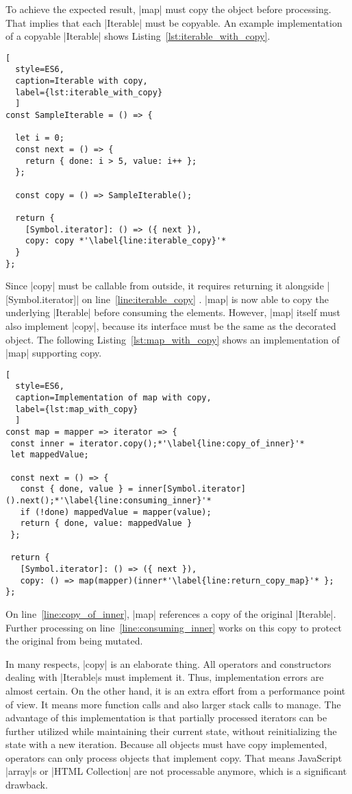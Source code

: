 To achieve the expected result, |map| must copy the object before processing.
That implies that each |Iterable| must be copyable. An example implementation
of a copyable |Iterable| shows Listing~\ref{lst:iterable_with_copy}.

\begin{lstlisting}[
  style=ES6, 
  caption=Iterable with copy,
  label={lst:iterable_with_copy}
  ]
const SampleIterable = () => {

  let i = 0;
  const next = () => {
    return { done: i > 5, value: i++ };
  };

  const copy = () => SampleIterable();

  return {
    [Symbol.iterator]: () => ({ next }),
    copy: copy *'\label{line:iterable_copy}'*
  }
};
\end{lstlisting}
Since |copy| must be callable from outside, it requires returning it alongside 
|[Symbol.iterator]| on line~\ref{line:iterable_copy} . |map| is now
able to copy the underlying  |Iterable| before consuming the elements.
However, |map| itself must also implement |copy|, because its interface must be
the same as the decorated object. The following Listing~\ref{lst:map_with_copy} 
shows an implementation of |map| supporting copy.

\begin{lstlisting}[
  style=ES6, 
  caption=Implementation of map with copy,
  label={lst:map_with_copy}
  ]
const map = mapper => iterator => {
 const inner = iterator.copy();*'\label{line:copy_of_inner}'*
 let mappedValue;

 const next = () => {
   const { done, value } = inner[Symbol.iterator]().next();*'\label{line:consuming_inner}'*
   if (!done) mappedValue = mapper(value);
   return { done, value: mappedValue }
 };

 return {
   [Symbol.iterator]: () => ({ next }),
   copy: () => map(mapper)(inner*'\label{line:return_copy_map}'* };
};
\end{lstlisting}
On line~\ref{line:copy_of_inner}, |map| references a copy of the original
|Iterable|. Further processing on line~\ref{line:consuming_inner} works on this 
copy to protect the original from being mutated.

In many respects, |copy| is an elaborate thing. All operators and constructors 
dealing with |Iterable|s must implement it. Thus, implementation errors are 
almost certain. On the other hand, it is an extra effort from a performance point 
of view. It means more function calls and also larger stack calls to manage.
The advantage of this implementation is that partially processed iterators can
be further utilized while maintaining their current state, without
reinitializing the state with a new iteration.
Because all objects must have copy implemented, operators can 
only process objects that implement copy. That means JavaScript |array|s or
|HTML Collection| are not processable anymore, which is a significant drawback.

